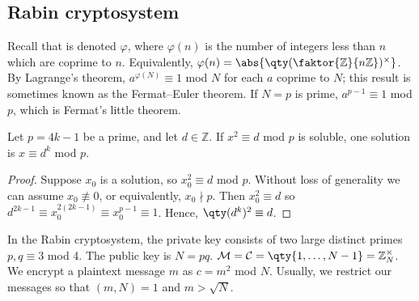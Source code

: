 \subsection{Rabin cryptosystem}
Recall that  is denoted $\varphi$, where $\varphi(n)$ is the number of integers less than $n$ which are coprime to $n$.
Equivalently, $\varphi(n) = \abs{\qty(\faktor{\mathbb Z}{n\mathbb Z})^\times}$.
By Lagrange's theorem, $a^{\varphi(N)} \equiv 1$ mod $N$ for each $a$ coprime to $N$; this result is sometimes known as the Fermat--Euler theorem.
If $N = p$ is prime, $a^{p-1} \equiv 1$ mod $p$, which is Fermat's little theorem.
\begin{lemma}
    Let $p = 4k - 1$ be a prime, and let $d \in \mathbb Z$.
    If $x^2 \equiv d$ mod $p$ is soluble, one solution is $x \equiv d^k$ mod $p$.
\end{lemma}
\begin{proof}
    Suppose $x_0$ is a solution, so $x_0^2 \equiv d$ mod $p$.
    Without loss of generality we can assume $x_0 \not\equiv 0$, or equivalently, $x_0 \nmid p$.
    Then $x_0^2 \equiv d$ so $d^{2k-1} \equiv x_0^{2(2k-1)} \equiv x_0^{p-1} \equiv 1$.
    Hence, $\qty(d^k)^2 \equiv d$.
\end{proof}
In the Rabin cryptosystem, the private key consists of two large distinct primes $p, q \equiv 3$ mod 4.
The public key is $N = pq$.
$\mathcal M = \mathcal C = \qty{1, \dots, N-1} = \mathbb Z_N^\times$.
We encrypt a plaintext message $m$ as $c = m^2$ mod $N$.
Usually, we restrict our messages so that $(m, N) = 1$ and $m > \sqrt{N}$.

